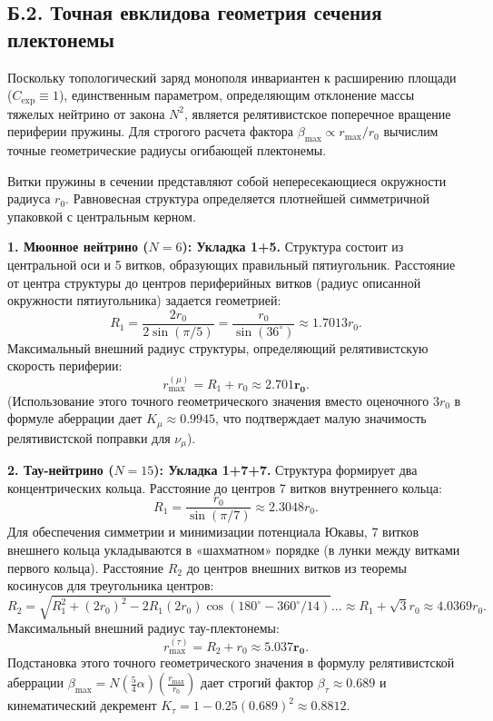 \documentclass[11pt,a4paper]{article}
\begin{document}
\subsection*{Б.2. Точная евклидова геометрия сечения плектонемы}
	Поскольку топологический заряд монополя инвариантен к расширению площади ($C_{\text{exp}} \equiv 1$), единственным параметром, определяющим отклонение массы тяжелых нейтрино от закона $N^2$, является релятивистское поперечное вращение периферии пружины. Для строгого расчета фактора $\beta_{\text{max}} \propto r_{\text{max}}/r_0$ вычислим точные геометрические радиусы огибающей плектонемы.
	
	Витки пружины в сечении представляют собой непересекающиеся окружности радиуса $r_0$. Равновесная структура определяется плотнейшей симметричной упаковкой с центральным керном.
	
	\textbf{1. Мюонное нейтрино ($N=6$): Укладка 1+5.}
	Структура состоит из центральной оси и 5 витков, образующих правильный пятиугольник. Расстояние от центра структуры до центров периферийных витков (радиус описанной окружности пятиугольника) задается геометрией:
	\begin{equation}
		R_1 = \frac{2 r_0}{2 \sin(\pi/5)} = \frac{r_0}{\sin(36^\circ)} \approx 1.7013 r_0.
	\end{equation}
	Максимальный внешний радиус структуры, определяющий релятивистскую скорость периферии:
	\begin{equation}
		r_{\text{max}}^{(\mu)} = R_1 + r_0 \approx \mathbf{2.701 r_0}.
	\end{equation}
	(Использование этого точного геометрического значения вместо оценочного $3r_0$ в формуле аберрации дает $K_\mu \approx 0.9945$, что подтверждает малую значимость релятивистской поправки для $\nu_\mu$).
	
	\textbf{2. Тау-нейтрино ($N=15$): Укладка 1+7+7.}
	Структура формирует два концентрических кольца. Расстояние до центров 7 витков внутреннего кольца:
	\begin{equation}
		R_1 = \frac{r_0}{\sin(\pi/7)} \approx 2.3048 r_0.
	\end{equation}
	Для обеспечения симметрии и минимизации потенциала Юкавы, 7 витков внешнего кольца укладываются в «шахматном» порядке (в лунки между витками первого кольца). Расстояние $R_2$ до центров внешних витков из теоремы косинусов для треугольника центров:
	\begin{equation}
		R_2 = \sqrt{R_1^2 + (2r_0)^2 - 2R_1(2r_0)\cos(180^\circ - 360^\circ/14)} \dots \approx R_1 + \sqrt{3}r_0 \approx 4.0369 r_0.
	\end{equation}
	Максимальный внешний радиус тау-плектонемы:
	\begin{equation}
		r_{\text{max}}^{(\tau)} = R_2 + r_0 \approx \mathbf{5.037 r_0}.
	\end{equation}
	Подстановка этого точного геометрического значения в формулу релятивистской аберрации $\beta_{\text{max}} = N (\frac{5}{4}\alpha) (\frac{r_{\text{max}}}{r_0})$ дает строгий фактор $\beta_\tau \approx 0.689$ и кинематический декремент $K_\tau = 1 - 0.25(0.689)^2 \approx \mathbf{0.8812}$.
	
\end{document}
